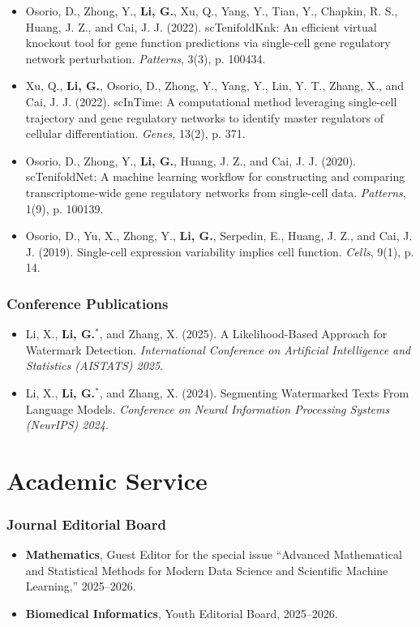 \documentclass[letterpaper,11pt]{article}
\begin{document}
\begin{itemize}[leftmargin=0.15in, label={}]
    \item Osorio, D., Zhong, Y., \textbf{Li, G.}, Xu, Q., Yang, Y., Tian, Y., Chapkin, R. S., Huang, J. Z., and Cai, J. J. (2022). scTenifoldKnk: An efficient virtual knockout tool for gene function predictions via single-cell gene regulatory network perturbation. \textit{Patterns}, 3(3), p. 100434.
    \item Xu, Q., \textbf{Li, G.}, Osorio, D., Zhong, Y., Yang, Y., Lin, Y. T., Zhang, X., and Cai, J. J. (2022). scInTime: A computational method leveraging single-cell trajectory and gene regulatory networks to identify master regulators of cellular differentiation. \textit{Genes}, 13(2), p. 371.
    \item Osorio, D., Zhong, Y., \textbf{Li, G.}, Huang, J. Z., and Cai, J. J. (2020). scTenifoldNet: A machine learning workflow for constructing and comparing transcriptome-wide gene regulatory networks from single-cell data. \textit{Patterns}, 1(9), p. 100139.
    \item Osorio, D., Yu, X., Zhong, Y., \textbf{Li, G.}, Serpedin, E., Huang, J. Z., and Cai, J. J. (2019). Single-cell expression variability implies cell function. \textit{Cells}, 9(1), p. 14.
\end{itemize}

\subsubsection*{Conference Publications}
\begin{itemize}[leftmargin=0.15in, label={}]
    \item Li, X., \textbf{Li, G.$^*$}, and Zhang, X. (2025). A Likelihood-Based Approach for Watermark Detection. \textit{International Conference on Artificial Intelligence and Statistics (AISTATS) 2025}.
    \item Li, X., \textbf{Li, G.$^*$}, and Zhang, X. (2024). Segmenting Watermarked Texts From Language Models. \textit{Conference on Neural Information Processing Systems (NeurIPS) 2024}.
\end{itemize}

\section{Academic Service}
\subsubsection*{Journal Editorial Board}
\begin{itemize}[leftmargin=0.15in, label={}]
    \item \textbf{Mathematics}, Guest Editor for the special issue ``Advanced Mathematical and Statistical Methods for Modern Data Science and Scientific Machine Learning,'' 2025--2026.
    \item \textbf{Biomedical Informatics}, Youth Editorial Board, 2025--2026.
\end{itemize}
\end{document}
